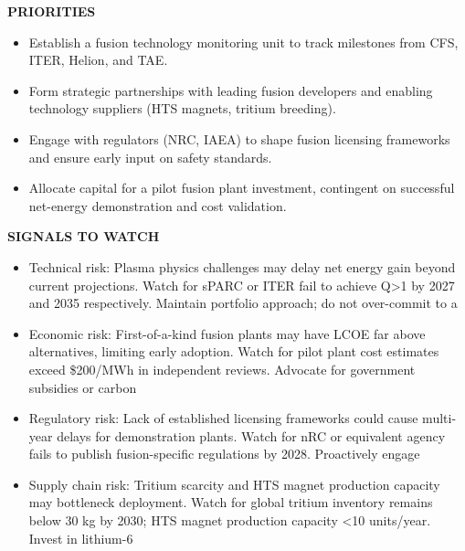\documentclass[10pt,a4paper]{article}
\begin{document}
\begin{minipage}[t]{0.47\linewidth}
{\textcolor{BOGreen}{\scriptsize\bfseries PRIORITIES}}\par\vspace{3pt}
{\small\begin{itemize}
\item Establish a fusion technology monitoring unit to track milestones from CFS, ITER, Helion, and TAE.
\item Form strategic partnerships with leading fusion developers and enabling technology suppliers (HTS magnets, tritium breeding).
\item Engage with regulators (NRC, IAEA) to shape fusion licensing frameworks and ensure early input on safety standards.
\item Allocate capital for a pilot fusion plant investment, contingent on successful net-energy demonstration and cost validation.
\end{itemize}}
\end{minipage}\hfill\begin{minipage}[t]{0.45\linewidth}
{\textcolor{BOGreen}{\scriptsize\bfseries SIGNALS TO WATCH}}\par\vspace{3pt}
{\small\begin{itemize}
\item Technical risk: Plasma physics challenges may delay net energy gain beyond current projections. Watch for sPARC or ITER fail to achieve Q>1 by 2027 and 2035 respectively. Maintain portfolio approach; do not over-commit to a
\item Economic risk: First-of-a-kind fusion plants may have LCOE far above alternatives, limiting early adoption. Watch for pilot plant cost estimates exceed \$200/MWh in independent reviews. Advocate for government subsidies or carbon
\item Regulatory risk: Lack of established licensing frameworks could cause multi-year delays for demonstration plants. Watch for nRC or equivalent agency fails to publish fusion-specific regulations by 2028. Proactively engage
\item Supply chain risk: Tritium scarcity and HTS magnet production capacity may bottleneck deployment. Watch for global tritium inventory remains below 30 kg by 2030; HTS magnet production capacity <10 units/year. Invest in lithium-6
\end{itemize}}
\end{minipage}
\end{document}
